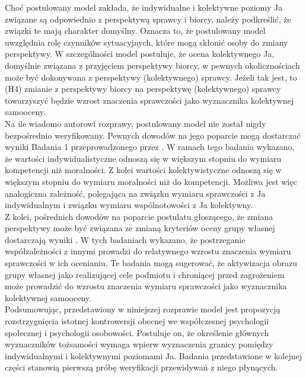 \documentclass[man]{apa6}
\begin{document}
Choć postulowany model zakłada, że indywidualne i kolektywne poziomy Ja związane są odpowiednio z perspektywą sprawcy i biorcy, należy podkreślić, że związki te mają charakter domyślny. Oznacza to, że postulowany model uwzględnia rolę czynników sytuacyjnych, które mogą skłonić osoby do zmiany perspektywy. W szczególności model postuluje, że ocena kolektywnego Ja, domyślnie związana z przyjęciem perspektywy biorcy, w pewnych okolicznościach może być dokonywana z perspektywy (kolektywnego) sprawcy. Jeżeli tak jest, to (H4) zmianie z perspektywy biorcy na perspektywę (kolektywnego) sprawcy towarzyszyć będzie wzrost znaczenia sprawczości jako wyznacznika kolektywnej samooceny.\\

Na ile wiadomo autorowi rozprawy, postulowany model nie został nigdy bezpośrednio weryfikowany. Pewnych dowodów na jego poparcie mogą dostarczać wyniki Badania 1 przeprowadzonego przez \textcite{wojciszke1997parallels}. W ramach tego badania wykazano, że wartości indywidualistyczne odnoszą się w większym stopniu do wymiaru kompetencji niż moralności. Z kolei wartości kolektywistyczne odnoszą się w większym stopniu do wymiaru moralności niż do kompetencji. Możliwa jest więc analogiczna zależność, polegająca na związku wymiaru sprawczości z Ja indywidualnym i związku wymiaru wspólnotowości z Ja kolektywny.\\

Z kolei, pośrednich dowodów na poparcie postulatu głoszącego, że zmiana perspektywy może być związana ze zmianą kryteriów oceny grupy własnej dostarczają wyniki \textcite{wojciszke2008primacy}. W tych badaniach wykazano, że postrzeganie współzależności z innymi prowadzi do relatywnego wzrostu znaczenia wymiaru sprawczości w ich ocenianiu. Te badania mogą sugerować, że aktywizacja obrazu grupy własnej jako realizującej cele podmiotu i chroniącej przed zagrożeniem może prowadzić do wzrostu znaczenia wymiaru sprawczości jako wyznacznika kolektywnej samooceny.\\

Podsumowując, przedstawiony w niniejszej rozprawie model jest propozycją rozstrzygnięcia istotnej kontrowersji obecnej we współczesnej psychologii społecznej i psychologii osobowości. Postuluje on, że określenie głównych wyznaczników tożsamości wymaga wpierw wyznaczenia granicy pomiędzy indywidualnymi i kolektywnymi poziomami Ja. Badania przedstawione w kolejnej części stanowią pierwszą próbę weryfikacji przewidywań z niego płynących.\\
\end{document}

